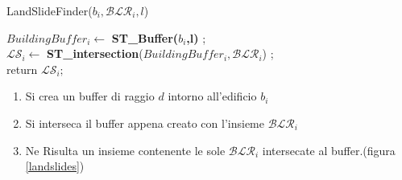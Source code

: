 \begin{algorithm}[H]
	
	\IncMargin{1em}
	\caption{LandSlideFinder($b_i , \mathcal{BLR}_i, l$) }
	\label{alg:four}
	\BlankLine
	\SetAlgoNoLine
	$ BuildingBuffer_i  \leftarrow $ \textbf{ST\_Buffer($b_i$,l)} ;\\
	$ \mathcal{LS}_i \leftarrow $ \textbf{ST\_intersection}($BuildingBuffer_i,\mathcal{BLR}_i $) ;\\
	return $\mathcal{LS}_i;$
\end{algorithm}

\begin{enumerate}
	\item Si crea un buffer di raggio $d$ intorno all'edificio $b_i$
	\item Si interseca il buffer appena creato con l'insieme  $\mathcal{BLR}_i$
	\item Ne Risulta un insieme contenente le sole $\mathcal{BLR}_i$ intersecate al buffer.(figura \ref{landslides}) 
\end{enumerate}

